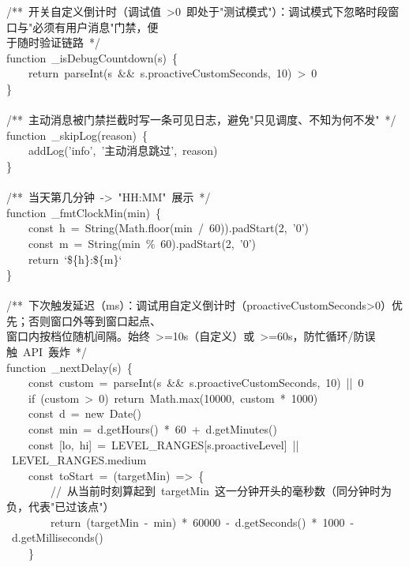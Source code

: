 \documentclass[a4paper,10pt]{article}
\begin{document}
{\ttfamily\footnotesize\raggedright
/**~开关自定义倒计时（调试值~>0~即处于"测试模式"）：调试模式下忽略时段窗口与"必须有用户消息"门禁，便\\
于随时验证链路~*/\\
function~\_isDebugCountdown(s)~\{\\
~~~~return~parseInt(s~\&\&~s.proactiveCustomSeconds,~10)~>~0\\
\}\\
\mbox{}\\
/**~主动消息被门禁拦截时写一条可见日志，避免"只见调度、不知为何不发"~*/\\
function~\_skipLog(reason)~\{\\
~~~~addLog('info',~'主动消息跳过',~reason)\\
\}\\
\mbox{}\\
/**~当天第几分钟~->~"HH:MM"~展示~*/\\
function~\_fmtClockMin(min)~\{\\
~~~~const~h~=~String(Math.floor(min~/~60)).padStart(2,~'0')\\
~~~~const~m~=~String(min~\%~60).padStart(2,~'0')\\
~~~~return~`\$\{h\}:\$\{m\}`\\
\}\\
\mbox{}\\
/**~下次触发延迟（ms）：调试用自定义倒计时（proactiveCustomSeconds>0）优先；否则窗口外等到窗口起点、\\
窗口内按档位随机间隔。始终~>=10s（自定义）或~>=60s，防忙循环/防误触~API~轰炸~*/\\
function~\_nextDelay(s)~\{\\
~~~~const~custom~=~parseInt(s~\&\&~s.proactiveCustomSeconds,~10)~||~0\\
~~~~if~(custom~>~0)~return~Math.max(10000,~custom~*~1000)\\
~~~~const~d~=~new~Date()\\
~~~~const~min~=~d.getHours()~*~60~+~d.getMinutes()\\
~~~~const~[lo,~hi]~=~LEVEL\_RANGES[s.proactiveLevel]~||~LEVEL\_RANGES.medium\\
~~~~const~toStart~=~(targetMin)~=>~\{\\
~~~~~~~~//~从当前时刻算起到~targetMin~这一分钟开头的毫秒数（同分钟时为负，代表"已过该点"）\\
~~~~~~~~return~(targetMin~-~min)~*~60000~-~d.getSeconds()~*~1000~-~d.getMilliseconds()\\
~~~~\}\\
}
\end{document}
